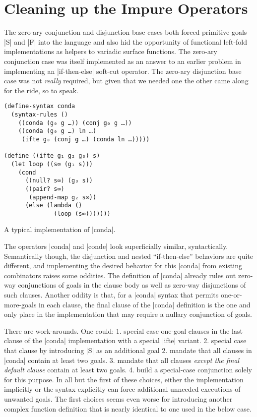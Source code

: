 \documentclass[sigplan,screen,draft,anonymous,review,natbib=false]{acmart}
\begin{document}
\section{Cleaning up the Impure Operators}\label{sec:impure}

The zero-ary conjunction and disjunction base cases both forced
primitive goals \rackinline|S| and \rackinline|F| into the language
and also hid the opportunity of functional left-fold implementations
as helpers to variadic surface functions. The zero-ary conjunction
case was itself implemented as an answer to an earlier problem in
implementing an \rackinline|if-then-else| soft-cut operator. The
zero-ary disjunction base case was not \emph{really} required, but
given that we needed one the other came along for the ride, so to
speak.

\begin{listing}
  \begin{verbatim}
(define-syntax conda
  (syntax-rules ()
    ((conda (g₀ g …)) (conj g₀ g …))
    ((conda (g₀ g …) ln …)
     (ifte g₀ (conj g …) (conda ln …)))))

(define ((ifte g₁ g₂ g₃) s)
  (let loop ((s∞ (g₁ s)))
    (cond
      ((null? s∞) (g₃ s))
      ((pair? s∞)
       (append-map g₂ s∞))
      (else (lambda ()
              (loop (s∞)))))))
  \end{verbatim}
  \caption{A typical implementation of \rackinline|conda|.}
  \label{mnt:conda-implementation}
\end{listing}

The operators \rackinline|conda| and \rackinline|conde| look
superficially similar, syntactically. Semantically though, the
disjunction and nested \enquote{if-then-else} behaviors are quite
different, and implementing the desired behavior for this
\rackinline|conda| from existing combinators raises some oddities. The
definition of \rackinline|conda| already rules out zero-way
conjunctions of goals in the clause body as well as zero-way
disjunctions of such clauses. Another oddity is that, for a
\rackinline|conda| syntax that permits one-or-more-goals in each
clause, the final clause of the \rackinline|conda| definition is the
one and only place in the implementation that may require a nullary
conjunction of goals.

There are work-arounds. One could: 1. special case one-goal clauses in
the last clause of the \rackinline|conda| implementation with a
special \rackinline|ifte| variant. 2. special case that clause by
introducing \rackinline|S| as an additional goal 2. mandate that all
clauses in \rackinline|conda| contain at least two goals. 3. mandate
that all clauses \emph{except the final default clause} contain at
least two goals. 4. build a special-case conjunction solely for this
purpose. In all but the first of these choices, either the
implementation implicitly or the syntax explicitly can force
additional unneeded executions of unwanted goals. The first choices
seems even worse for introducing another complex function definition
that is nearly identical to one used in the below case.
\end{document}
